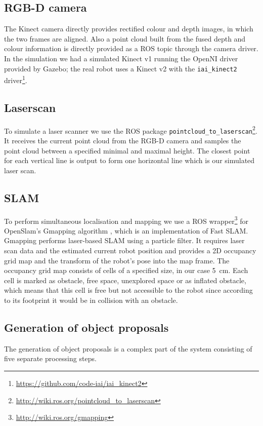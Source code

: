 \documentclass[a4paper,11pt,english]{article}
\begin{document}
\subsection{RGB-D camera}
The Kinect camera directly provides rectified colour and depth images, in which the two frames are aligned.
Also a point cloud built from the fused depth and colour information is directly provided as a ROS topic through the camera driver.
In the simulation we had a simulated Kinect v1 running the OpenNI driver provided by Gazebo; the real robot uses a Kinect v2 with the \texttt{iai\_kinect2} driver\footnote{\url{https://github.com/code-iai/iai_kinect2}}.

\subsection{Laserscan}
To simulate a laser scanner we use the ROS package \texttt{pointcloud\_to\_laserscan}\footnote{\url{http://wiki.ros.org/pointcloud_to_laserscan}}.
It receives the current point cloud from the RGB-D camera and samples the point cloud between a specified minimal and maximal height.
The closest point for each vertical line is output to form one horizontal line which is our simulated laser scan.

\subsection{SLAM}
To perform simultaneous localisation and mapping we use a ROS wrapper\footnote{\url{http://wiki.ros.org/gmapping}} for OpenSlam's Gmapping algorithm \cite{grisetti2007}, which is an implementation of Fast SLAM.
Gmapping performs laser-based SLAM using a particle filter.
It requires laser scan data and the estimated current robot position and provides a 2D occupancy grid map and the transform of the robot's pose into the map frame.
The occupancy grid map consists of cells of a specified size, in our case \SI{5}{\centi\meter}.
Each cell is marked as obstacle, free space, unexplored space or as inflated obstacle, which means that this cell is free but not accessible to the robot since according to its footprint it would be in collision with an obstacle.

\subsection{Generation of object proposals}
The generation of object proposals is a complex part of the system consisting of five separate processing steps.
\end{document}
